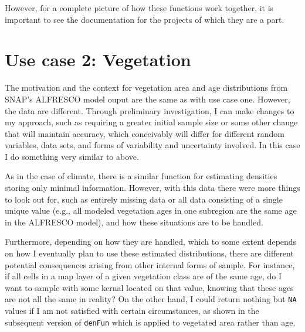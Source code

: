 \documentclass{article}\usepackage[]{graphicx}\usepackage[]{color}
\begin{document}
However, for a complete picture of how these functions work together, it is important to see the documentation for the projects of which they are a part.

\section{Use case 2: Vegetation}
The motivation and the context for vegetation area and age distributions from SNAP's ALFRESCO model ouput are the same as with use case one.
However, the data are different.
Through preliminary investigation, I can make changes to my approach, such as requiring a greater initial sample size or some other change that will maintain accuracy,
which conceivably will differ for different random variables, data sets, and forms of variability and uncertainty involved.
In this case I do something very similar to above.

As in the case of climate, there is a similar function for estimating densities storing only minimal information.
However, with this data there were more things to look out for,
such as entirely missing data or all data consisting of a single unique value (e.g., all modeled vegetation ages in one subregion are the same age in the ALFRESCO model),
and how these situations are to be handled.

Furthermore, depending on how they are handled, which to some extent depends on how I eventually plan to use these estimated distributions,
there are different potential consequences arising from other internal forms of sample.
For instance, if all cells in a map layer of a given vegetation class are of the same age, do I want to sample with some kernal located on that value, knowing that these ages are not all the same in reality?
On the other hand, I could return nothing but \texttt{NA} values if I am not satisfied with certain circumstances, as shown in the subsequent version of \texttt{denFun} which is applied to vegetated area rather than age.
\end{document}
